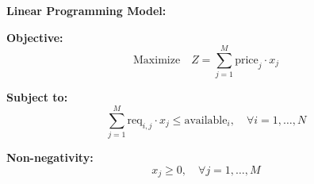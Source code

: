 \documentclass{article}
\begin{document}
\textbf{Linear Programming Model:}

\textbf{Objective:} 
\[
\text{Maximize} \quad Z = \sum_{j=1}^{M} \text{price}_j \cdot x_j 
\]

\textbf{Subject to:}
\[
\sum_{j=1}^{M} \text{req}_{i,j} \cdot x_j \leq \text{available}_i, \quad \forall i = 1, \ldots, N
\]

\textbf{Non-negativity:}
\[
x_j \geq 0, \quad \forall j = 1, \ldots, M
\]
\end{document}
